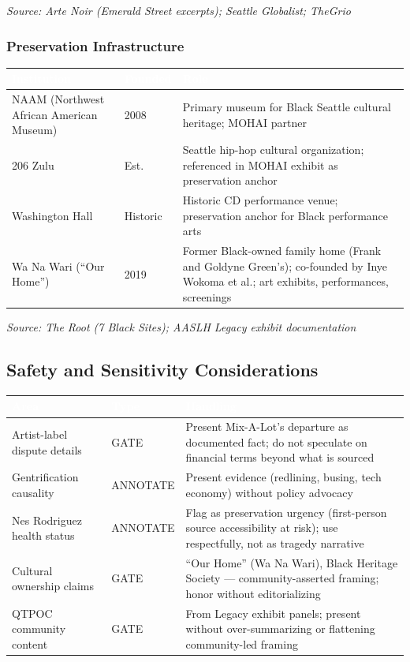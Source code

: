 \documentclass[11pt,letterpaper]{article}
\newcommand{\tableheader}[1]{\textbf{\sffamily\textcolor{white}{#1}}}
\begin{document}
\textit{Source: Arte Noir (Emerald Street excerpts); Seattle Globalist; TheGrio}

\subsubsection{Preservation Infrastructure}

\begin{center}
\begin{tabularx}{\textwidth}{L{3.5cm}L{1.8cm}X}
\toprule
{}
\tableheader{Institution} & \tableheader{Founded} & \tableheader{Role} \\
\midrule
NAAM (Northwest African American Museum) & 2008 & Primary museum for Black Seattle cultural heritage; MOHAI partner \\
206 Zulu & Est. & Seattle hip-hop cultural organization; referenced in MOHAI exhibit as preservation anchor \\
Washington Hall & Historic & Historic CD performance venue; preservation anchor for Black performance arts \\
Wa Na Wari (``Our Home'') & 2019 & Former Black-owned family home (Frank and Goldyne Green's); co-founded by Inye Wokoma et al.; art exhibits, performances, screenings \\
\bottomrule
\end{tabularx}
\end{center}

\textit{Source: The Root (7 Black Sites); AASLH Legacy exhibit documentation}

\subsection{Safety and Sensitivity Considerations}

\begin{center}
\begin{tabularx}{\textwidth}{L{3.5cm}L{2cm}X}
\toprule
{}
\tableheader{Area} & \tableheader{Type} & \tableheader{Handling} \\
\midrule
Artist-label dispute details & GATE & Present Mix-A-Lot's departure as documented fact; do not speculate on financial terms beyond what is sourced \\
Gentrification causality & ANNOTATE & Present evidence (redlining, busing, tech economy) without policy advocacy \\
Nes Rodriguez health status & ANNOTATE & Flag as preservation urgency (first-person source accessibility at risk); use respectfully, not as tragedy narrative \\
Cultural ownership claims & GATE & ``Our Home'' (Wa Na Wari), Black Heritage Society --- community-asserted framing; honor without editorializing \\
QTPOC community content & GATE & From Legacy exhibit panels; present without over-summarizing or flattening community-led framing \\
\bottomrule
\end{tabularx}
\end{center}
\end{document}

